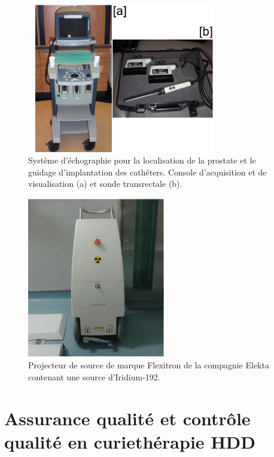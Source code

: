 \begin{figure}[!ht]
\centering
\includegraphics[width=8.5cm,height=6.5cm]{ImagerieSonde.eps}
\caption{\label{ImagerieSonde} Système d’échographie pour la localisation de la prostate et le guidage d’implantation des cathéters. Console d’acquisition et de visualisation (a) et sonde transrectale (b).}
\end{figure}
%
\begin{figure}[!ht]
\centering
\includegraphics[width=6.0cm,height=7.0cm]{ProjecteurSource.eps}
\caption{\label{ProjecteurSource} Projecteur de source de marque Flexitron de la compagnie Elekta contenant une source d’Iridium-192.}
\end{figure}
%
\vspace{3cm}
\section{Assurance qualité et contrôle qualité en curiethérapie HDD}
